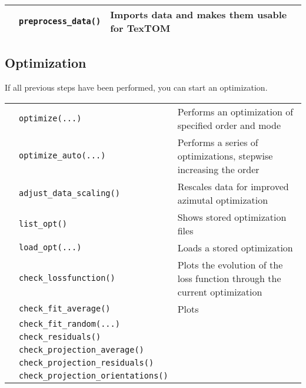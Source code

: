 \begin{table}[h!]
    \centering
    \begin{tabular}{| l | l | l |} 
        \hline
         & \texttt{preprocess\_data()} & Imports data and makes them usable for TexTOM\\
      \hline
     \end{tabular}
\end{table}

\subsection{Optimization}
If all previous steps have been performed, you can start an optimization.
\begin{table}[h!]
    \centering
    \begin{tabular}{| l | l | l |} 
        \hline
         & \texttt{optimize(...)} & Performs an optimization of specified order and mode\\
         & \texttt{optimize\_auto(...)} & Performs a series of optimizations, stepwise increasing the order\\
         & \texttt{adjust\_data\_scaling()} & Rescales data for improved azimutal optimization\\
      \hline
         & \texttt{list\_opt()} & Shows stored optimization files\\
         & \texttt{load\_opt(...)} & Loads a stored optimization\\
         \hline
         & \texttt{check\_lossfunction()} & Plots the evolution of the loss function through the current optimization\\
         & \texttt{check\_fit\_average()}  & Plots \\
         & \texttt{check\_fit\_random(...)}  & \\
         & \texttt{check\_residuals()}  & \\
         & \texttt{check\_projection\_average()}  & \\
         & \texttt{check\_projection\_residuals()}  & \\
         & \texttt{check\_projection\_orientations()}  & \\
      \hline
     \end{tabular}
\end{table}

